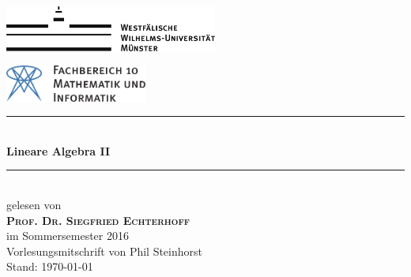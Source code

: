 \begin{titlepage}
	\newcommand{\HRule}{\rule{\linewidth}{0.8mm}} %

	\center %
 
	\begin{minipage}{0.4\textwidth}
	\begin{flushleft}
	\includegraphics[height=1.5cm,keepaspectratio]{../!config/Bilder/wwulogo.pdf}\\[1cm]
	\end{flushleft}
	\end{minipage}
	\hfill
	\begin{minipage}{0.4\textwidth}
	\begin{flushright}
	\vspace*{0.3cm}
	\includegraphics[height=1.2cm,keepaspectratio]{../!config/Bilder/fb10logo.pdf} \
	\end{flushright}
	\end{minipage}

	\vspace{2cm}
	


	\HRule \\[0.8cm]
	{ \huge \sffamily\bfseries Lineare Algebra II}\\[0.4cm] %
	\HRule \\[1cm]
 
	{\LARGE gelesen von} \\[.7cm]
	\textsc{\LARGE \textbf{Prof. Dr. Siegfried Echterhoff}}\\[.7cm]
	{\LARGE im Sommersemester 2016}\\[2cm]


	\vfill
	{\Large Vorlesungsmitschrift von Phil Steinhorst} \\[.5cm]
	{\large Stand: \today}
	
\end{titlepage}